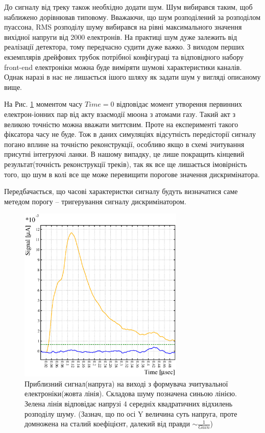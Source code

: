 \documentclass[]{article}
\begin{document}
	До сигналу від треку також необхідно додати шум. Шум вибирався таким, щоб наближено дорівнював типовому. Вважаючи, що шум розподілений за розподілом пуассона, RMS розподілу шуму вибирався на рівні максимального значення вихідної напруги від 2000 електронів. На практиці шум дуже залежить від реалізації детектора, тому передчасно судити дуже важко. З виходом перших екземплярів дрейфових трубок потрібної конфігураці та відповідного набору front-end електроніки можна буде виміряти шумові характеристики каналів. Однак наразі в нас не лишається ішого шляху як задати шум у вигляді описаному вище.
	 
	На Рис. \ref{fig:signal_example} моментом часу $Time=0$ відповідає момент утворення первинних електрон-іонних пар від акту взаємодії мюона з атомами газу. Такий акт з великою точністю можна вважати миттєвим. Проте на експерименті такого фіксатора часу не буде. Тож в даних симуляціях відсутність передісторії сигналу погано вплине на точністю реконструкції, особливо якщо в схемі зчитування присутні інтегруючі ланки. В нашому випадку, це лише покращить кінцевий результат(точність реконструкції треків), так як все ще лишається імовірність того, що шум в колі все ще може перевищити порогове значення дискримінатора.
	
	Передбачається, що часові характеристки сигналу будуть визначатися саме метедом порогу -- тригерування  сигналу дискримінатором.
	
	\begin{figure}
	\centering
	\includegraphics[width=0.7\textwidth]{signal_noise_threshold.eps}
	\caption{ Приблизний сигнал(напруга) на виході з формувача зчитувальної електроніки(жовта лінія). Складова шуму позначена синьою лінією. Зелена лінія відповідає напрузі 4 середніх квадратичних відхилень розподілу шуму. (Зазнач, що по осі Y величина суть напруга, проте домножена на сталий коефіцієнт, далекий від правди $\sim \frac{1}{Gain}$)}
	\label{fig:signal_example}
	\end{figure}
	
\end{document}
